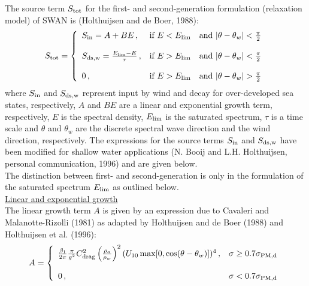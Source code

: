 \documentclass[12pt]{book}
\begin{document}
The source term $S_{\rm tot}$ for the first- and second-generation formulation (relaxation model) of
SWAN is (Holthuijsen and de Boer, 1988):
\begin{equation}
   S_{\rm tot} =
    \left\{
      \begin{array}{lll}
         S_{\rm in} = A + B E
         \, , & \mbox{if } E < E_{\rm lim} & \mbox{and } |\theta - \theta_w| < \frac{\pi}{2} \\
         \\
         S_{\rm ds,w} = \frac{E_{\rm lim} - E}{\tau}
         \, , & \mbox{if } E > E_{\rm lim} & \mbox{and } |\theta - \theta_w| < \frac{\pi}{2} \\
         \\
         0 \, , & \mbox{if } E > E_{\rm lim} & \mbox{and } |\theta - \theta_w| > \frac{\pi}{2} \\
      \end{array}
    \right.
  \label{eq:relaxmod}
\end{equation}
where $S_{\rm in}$ and $S_{\rm ds,w}$ represent input by wind and decay for over-developed sea states,
respectively, $A$ and $B E$ are a linear and exponential growth term, respectively, $E$ is the
spectral density, $E_{\rm lim}$ is the saturated spectrum, $\tau$ is a time scale and $\theta$ and
$\theta_w$ are the discrete spectral wave direction and the wind direction, respectively.
The expressions for the source terms $S_{\rm in}$ and $S_{\rm ds,w}$ have been modified for shallow water applications
(N. Booij and L.H. Holthuijsen, personal communication, 1996) and are given below.
\nocite{Hol88B}
\\[2ex]
\noindent
The distinction between first- and second-generation is only in the formulation of the
saturated spectrum $E_{\rm lim}$ as outlined below.
\\[2ex]
\noindent
\underline{Linear and exponential growth}\\[2ex]
The linear growth term $A$ is given by  an expression due to Cavaleri and Malanotte-Rizolli
(1981) as adapted by Holthuijsen and de Boer (1988) and Holthuijsen et al. (1996):
\begin{equation}
   A =
    \left\{
      \begin{array}{ll}
         \frac{\beta_1}{2\pi} \frac{\pi}{g^2} C^2_{\rm drag} \left(  \frac{\rho_a}{\rho_w} \right)^2 (U_{10} \max [0,\cos(\theta-\theta_w)])^4
         \, , &  \sigma \geq 0.7 \sigma_{\rm PM,d} \\
         \\
         0 \, , & \sigma < 0.7 \sigma_{\rm PM,d} \\
      \end{array}
    \right.
\end{equation}
\end{document}
